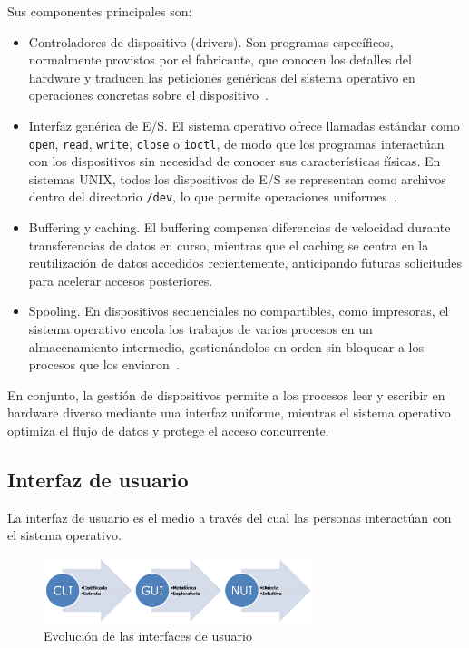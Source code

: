 Sus componentes principales son:
\begin{itemize}
    \item Controladores de dispositivo (drivers). Son programas específicos, normalmente provistos por el fabricante, que conocen los detalles del hardware y traducen las peticiones genéricas del sistema operativo en operaciones concretas sobre el dispositivo~\citep{torres2024}.
    \item Interfaz genérica de E/S. El sistema operativo ofrece llamadas estándar como \texttt{open}, \texttt{read}, \texttt{write}, \texttt{close} o \texttt{ioctl}, 
    de modo que los programas interactúan con los dispositivos sin necesidad de conocer sus características físicas. 
    En sistemas UNIX, todos los dispositivos de E/S se representan como archivos dentro del directorio \texttt{/dev}, lo que permite operaciones uniformes~\citep{torres2024}.
    \item Buffering y caching. El buffering compensa diferencias de velocidad durante transferencias de datos en curso, mientras que el caching se centra en la reutilización de datos accedidos recientemente, anticipando futuras solicitudes para acelerar accesos posteriores.
    \item Spooling. En dispositivos secuenciales no compartibles, como impresoras, el sistema operativo encola los trabajos de varios procesos en un almacenamiento intermedio, 
    gestionándolos en orden sin bloquear a los procesos que los enviaron~\citep{torres2024}.
\end{itemize}

En conjunto, la gestión de dispositivos permite a los procesos leer y escribir en hardware diverso mediante una interfaz uniforme, mientras el sistema operativo optimiza el flujo de datos y protege el acceso concurrente.

\subsection{Interfaz de usuario}
La interfaz de usuario es el medio a través del cual las personas interactúan con el sistema operativo.
\begin{figure}[H]
    \centering
    \includegraphics[width=0.7\textwidth]{figures/interfaz.png}
    \caption[Evolución de las interfaces de usuario]%
            {Evolución de las interfaces de usuario \citep{wikipedia4}}
    \label{fig:Evolucion_Interfaz}
\end{figure}


